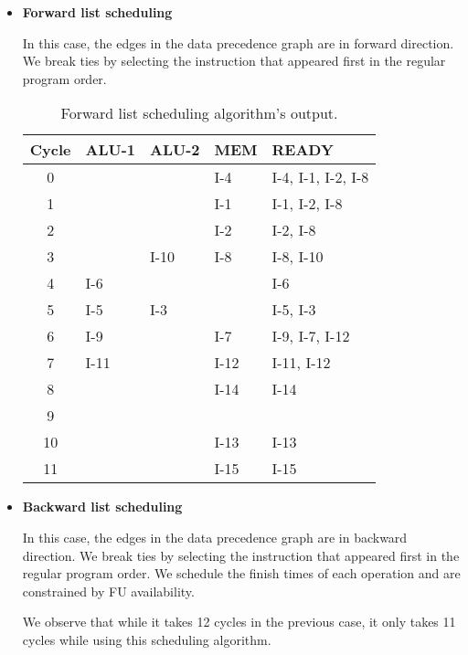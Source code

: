 \begin{itemize}
\item \textbf{Forward list scheduling}

  In this case, the edges in the data precedence graph are in forward direction.
  We break ties by selecting the instruction that appeared first in the regular
  program order.
  
\begin{table}[!ht]
\centering
\begin{tabular}{c|l|l|l|l}
  \toprule
  \toprule
  \textbf{Cycle} & \textbf{ALU-1} & \textbf{ALU-2} & \textbf{MEM} & \textbf{READY} \\
  \midrule
  0  &      &      &  I-4  & I-4, I-1, I-2, I-8 \\ \hline
  1  &      &      &  I-1  & I-1, I-2, I-8      \\ \hline
  2  &      &      &  I-2  & I-2, I-8           \\ \hline
  3  &      & I-10 &  I-8  & I-8, I-10          \\ \hline
  4  & I-6  &      &       & I-6                \\ \hline
  5  & I-5  & I-3  &       & I-5, I-3           \\ \hline
  6  & I-9  &      &  I-7  & I-9, I-7, I-12     \\ \hline
  7  & I-11 &      &  I-12 & I-11, I-12         \\ \hline
  8  &      &      &  I-14 & I-14               \\ \hline
  9  &      &      &       &                    \\ \hline
  10 &      &      &  I-13 & I-13               \\ \hline
  11 &      &      &  I-15 & I-15               \\ \hline
  \bottomrule
\end{tabular}
\caption{Forward list scheduling algorithm's output.}
\end{table}

\item \textbf{Backward list scheduling}

  In this case, the edges in the data precedence graph are in backward direction.
  We break ties by selecting the instruction that appeared first in the regular
  program order. We schedule the finish times of each operation and are constrained
  by FU availability.

  We observe that while it takes 12 cycles in the previous case, it only takes 11
  cycles while using this scheduling algorithm.
  

\end{itemize}
